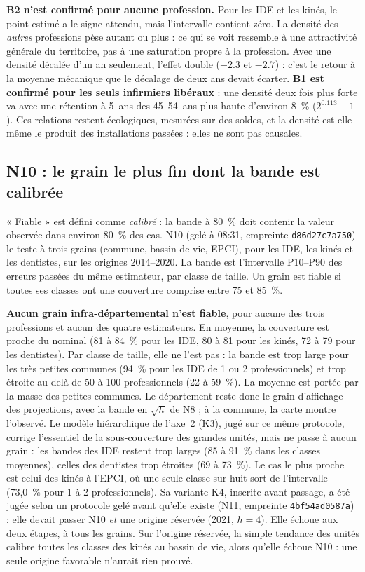 \documentclass[11pt]{article}
\begin{document}
\textbf{B2 n'est confirmé pour aucune profession.} Pour les IDE et les kinés, le point estimé a le
signe attendu, mais l'intervalle contient zéro. La densité des \emph{autres} professions pèse
autant ou plus : ce qui se voit ressemble à une attractivité générale du territoire, pas à une
saturation propre à la profession. Avec une densité décalée d'un an seulement, l'effet double
($\num{-2.3}$ et $\num{-2.7}$\mesure{}) : c'est le retour à la moyenne mécanique que le décalage de deux
ans devait écarter. \textbf{B1 est confirmé pour les seuls infirmiers libéraux} : une densité deux fois
plus forte va avec une rétention à 5~ans des 45--54~ans plus haute d'environ
8\derive{}~\% ($2^{0.113} - 1$). Ces relations restent écologiques, mesurées sur des soldes, et la
densité est elle-même le produit des installations passées : elles ne sont pas causales.

\subsection{N10 : le grain le plus fin dont la bande est calibrée}
« Fiable » est défini comme \emph{calibré} : la bande à 80~\% doit contenir la valeur observée dans
environ 80~\% des cas. N10 (gelé à 08:31, empreinte \texttt{d86d27c7a750}) le teste à trois grains
(commune, bassin de vie, EPCI), pour les IDE, les kinés et les dentistes, sur les origines
2014--2020. La bande est l'intervalle P10--P90 des erreurs passées du même estimateur, par classe de
taille. Un grain est fiable si toutes ses classes ont une couverture comprise entre 75 et 85~\%.

\textbf{Aucun grain infra-départemental n'est fiable}, pour aucune des trois professions et aucun des
quatre estimateurs. En moyenne, la couverture est proche du nominal (81 à 84\mesure{}~\% pour les IDE,
80 à 81 pour les kinés, 72 à 79 pour les dentistes). Par classe de taille, elle ne l'est pas : la bande
est trop large pour les très petites communes (94\mesure{}~\% pour les IDE de 1 ou 2
professionnels) et trop étroite au-delà de 50 à 100 professionnels (22 à 59\mesure{}~\%). La moyenne
est portée par la masse des petites communes. Le département reste donc le grain d'affichage des
projections, avec la bande en $\sqrt h$ de N8 ; à la commune, la carte montre l'observé. Le modèle
hiérarchique de l'axe~2 (K3), jugé sur ce même protocole, corrige l'essentiel de la sous-couverture
des grandes unités, mais ne passe à aucun grain : les bandes des IDE restent trop larges (85 à
91\mesure{}~\% dans les classes moyennes), celles des dentistes trop étroites (69 à 73\mesure{}~\%).
Le cas le plus proche est celui des kinés à l'EPCI, où une seule classe sur huit sort de l'intervalle
(73,0\mesure{}~\% pour 1 à 2 professionnels). Sa variante K4, inscrite avant passage, a été jugée selon un protocole gelé avant
qu'elle existe (N11, empreinte \texttt{4bf54ad0587a}) : elle devait passer N10 \emph{et} une origine
réservée (2021, $h = 4$). Elle échoue aux deux étapes, à tous les grains. Sur l'origine réservée, la simple
tendance des unités calibre toutes les classes des kinés au bassin de vie, alors qu'elle échoue N10 :
une seule origine favorable n'aurait rien prouvé.
\end{document}
